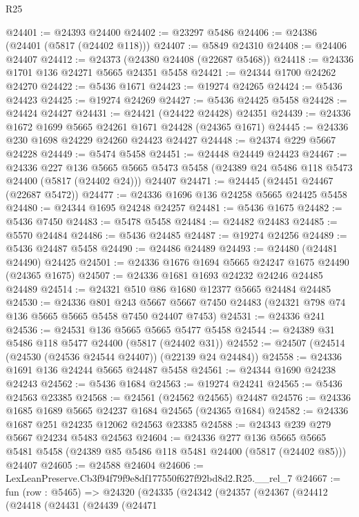 \begin{lexlean}{R25}
\begin{coremodule}
@24401 := @24393 @24400
@24402 := @23297 @5486
@24406 := @24386 (@24401 (@5817 (@24402 @118)))
@24407 := @5849 @24310
@24408 := @24406 @24407
@24412 := @24373 (@24380 @24408 (@22687 @5468))
@24418 := @24336 @1701 @136 @24271 @5665 @24351 @5458
@24421 := @24344 @1700 @24262 @24270
@24422 := @5436 @1671
@24423 := @19274 @24265
@24424 := @5436 @24423
@24425 := @19274 @24269
@24427 := @5436 @24425 @5458
@24428 := @24424 @24427
@24431 := @24421 (@24422 @24428) @24351
@24439 := @24336 @1672 @1699 @5665 @24261 @1671 @24428 (@24365 @1671)
@24445 := @24336 @230 @1698 @24229 @24260 @24423 @24427
@24448 := @24374 @229 @5667 @24228
@24449 := @5474 @5458
@24451 := @24448 @24449 @24423
@24467 := @24336
    @227
    @136
    @5665
    @5665
    @5473
    @5458
    (@24389 @24 @5486 @118 @5473 @24400 (@5817 (@24402 @24)))
    @24407
@24471 := @24445 (@24451 @24467 (@22687 @5472))
@24477 := @24336 @1696 @136 @24258 @5665 @24425 @5458
@24480 := @24344 @1695 @24248 @24257
@24481 := @5436 @1675
@24482 := @5436 @7450
@24483 := @5478 @5458
@24484 := @24482 @24483
@24485 := @5570 @24484
@24486 := @5436 @24485
@24487 := @19274 @24256
@24489 := @5436 @24487 @5458
@24490 := @24486 @24489
@24493 := @24480 (@24481 @24490) @24425
@24501 := @24336 @1676 @1694 @5665 @24247 @1675 @24490 (@24365 @1675)
@24507 := @24336 @1681 @1693 @24232 @24246 @24485 @24489
@24514 := @24321 @510 @86 @1680 @12377 @5665 @24484 @24485
@24530 := @24336
    @801
    @243
    @5667
    @5667
    @7450
    @24483
    (@24321 @798 @74 @136 @5665 @5665 @5458 @7450 @24407 @7453)
@24531 := @24336 @241
@24536 := @24531 @136 @5665 @5665 @5477 @5458
@24544 := @24389 @31 @5486 @118 @5477 @24400 (@5817 (@24402 @31))
@24552 := @24507 (@24514 (@24530 (@24536 @24544 @24407)) (@22139 @24 @24484))
@24558 := @24336 @1691 @136 @24244 @5665 @24487 @5458
@24561 := @24344 @1690 @24238 @24243
@24562 := @5436 @1684
@24563 := @19274 @24241
@24565 := @5436 @24563 @23385
@24568 := @24561 (@24562 @24565) @24487
@24576 := @24336 @1685 @1689 @5665 @24237 @1684 @24565 (@24365 @1684)
@24582 := @24336 @1687 @251 @24235 @12062 @24563 @23385
@24588 := @24343 @239 @279 @5667 @24234 @5483 @24563
@24604 := @24336
    @277
    @136
    @5665
    @5665
    @5481
    @5458
    (@24389 @85 @5486 @118 @5481 @24400 (@5817 (@24402 @85)))
    @24407
@24605 := @24588 @24604
@24606 := LexLeanPreserve.Cb3f94f79f9e8df177550f627f92bd8d2.R25.__rel_7
@24667 := fun (row : @5465) =>
  @24320
    (@24335
      (@24342
        (@24357
          (@24367
            (@24412
              (@24418
                (@24431
                  (@24439
                    (@24471

\end{coremodule}
\end{lexlean}

